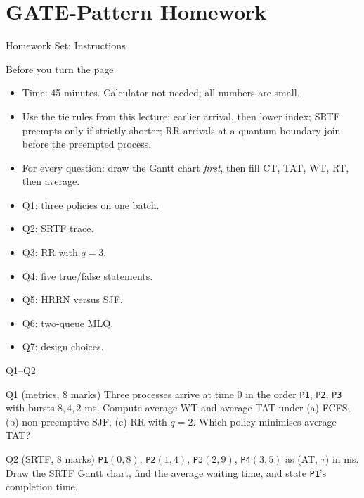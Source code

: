 \documentclass[aspectratio=169]{beamer}
\begin{document}
\section{GATE-Pattern Homework}


\begin{frame}{Homework Set: Instructions}
  \footnotesize
  \begin{block}{Before you turn the page}
    \begin{itemize}
      \item Time: 45 minutes. Calculator not needed; all numbers are small.
      \item Use the tie rules from this lecture: earlier arrival, then lower
        index; SRTF preempts only if strictly shorter; RR arrivals at a
        quantum boundary join before the preempted process.
      \item For every question: draw the Gantt chart \emph{first}, then fill
        CT, TAT, WT, RT, then average.
    \end{itemize}
  \end{block}
  \begin{itemize}
    \item Q1: three policies on one batch.
    \item Q2: SRTF trace.
    \item Q3: RR with $q=3$.
    \item Q4: five true/false statements.
    \item Q5: HRRN versus SJF.
    \item Q6: two-queue MLQ.
    \item Q7: design choices.
  \end{itemize}
\end{frame}

\begin{frame}{Q1--Q2}
  \begin{block}{Q1 \normalfont (metrics, 8 marks)}
    Three processes arrive at time 0 in the order \texttt{P1}, \texttt{P2},
    \texttt{P3} with bursts $8,4,2$ ms. Compute average WT and average TAT
    under (a) FCFS, (b) non-preemptive SJF, (c) RR with $q=2$. Which policy
    minimises average TAT?
  \end{block}
  \begin{block}{Q2 \normalfont (SRTF, 8 marks)}
    \texttt{P1}$(0,8)$, \texttt{P2}$(1,4)$, \texttt{P3}$(2,9)$,
    \texttt{P4}$(3,5)$ as (AT, $\tau$) in ms. Draw the SRTF Gantt chart,
    find the average waiting time, and state \texttt{P1}'s completion time.
  \end{block}
\end{frame}
\end{document}
